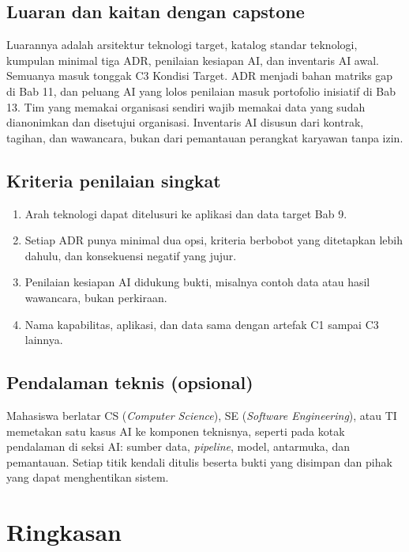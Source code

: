 \subsection*{Luaran dan kaitan dengan capstone}

Luarannya adalah arsitektur teknologi target, katalog standar teknologi,
kumpulan minimal tiga ADR, penilaian kesiapan AI, dan inventaris AI awal.
Semuanya masuk tonggak C3 Kondisi Target. ADR menjadi bahan matriks gap di
Bab 11, dan peluang AI yang lolos penilaian masuk portofolio inisiatif di
Bab 13. Tim yang memakai organisasi sendiri wajib memakai data yang sudah
dianonimkan dan disetujui organisasi. Inventaris AI disusun dari kontrak,
tagihan, dan wawancara, bukan dari pemantauan perangkat karyawan tanpa izin.

\subsection*{Kriteria penilaian singkat}

\begin{enumerate}
  \item Arah teknologi dapat ditelusuri ke aplikasi dan data target Bab 9.
  \item Setiap ADR punya minimal dua opsi, kriteria berbobot yang ditetapkan
        lebih dahulu, dan konsekuensi negatif yang jujur.
  \item Penilaian kesiapan AI didukung bukti, misalnya contoh data atau hasil
        wawancara, bukan perkiraan.
  \item Nama kapabilitas, aplikasi, dan data sama dengan artefak C1 sampai C3
        lainnya.
\end{enumerate}

\subsection*{Pendalaman teknis (opsional)}

Mahasiswa berlatar CS (\textit{Computer Science}), SE (\textit{Software
Engineering}), atau TI memetakan satu kasus AI ke komponen teknisnya, seperti
pada kotak pendalaman di seksi AI: sumber data, \textit{pipeline}, model,
antarmuka, dan pemantauan. Setiap titik kendali ditulis beserta bukti yang
disimpan dan pihak yang dapat menghentikan sistem.

\section{Ringkasan}

